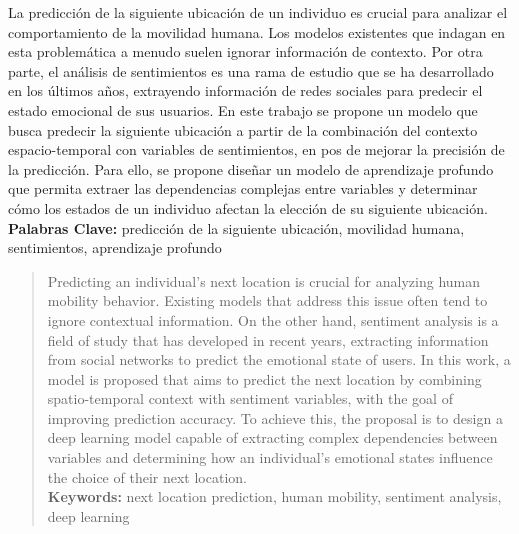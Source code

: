 \begin{resumen}
	La predicción de la siguiente ubicación de un individuo 
	es crucial para 
	analizar el comportamiento de la movilidad humana. 
	Los modelos existentes que indagan en esta problemática a 
	menudo suelen ignorar información de contexto. Por otra parte, 
	el análisis de sentimientos es una rama de estudio que se 
	ha desarrollado en los últimos años, extrayendo información 
	de redes sociales para predecir el estado emocional de sus usuarios.
	En este trabajo se propone un modelo que busca predecir la 
	siguiente ubicación a partir de la combinación del contexto 
	espacio-temporal con variables de sentimientos, en pos de mejorar 
	la precisión de la predicción. Para ello, se propone diseñar un 
	modelo de aprendizaje profundo que permita extraer las 
	dependencias complejas entre variables y determinar cómo los 
	estados de un individuo afectan la elección de su siguiente ubicación.\\

	\textbf{Palabras Clave:}
	predicci\'on de la siguiente ubicación, movilidad humana, sentimientos, aprendizaje profundo 
\end{resumen}
	
\begin{abstract}
	Predicting an individual's next location is crucial for analyzing 
	human mobility behavior. Existing models that address this issue often 
	tend to ignore contextual information. On the other hand, sentiment 
	analysis is a field of study that has developed in recent years, 
	extracting information from social networks to predict the emotional 
	state of users. In this work, a model is proposed that aims to 
	predict the next location by combining spatio-temporal context with 
	sentiment variables, with the goal of improving prediction accuracy.
	To achieve this, the proposal is to design a deep learning model 
	capable of extracting complex dependencies between variables and 
	determining how an individual's emotional states influence the 
	choice of their next location.\\

	\textbf{Keywords:}
	next location prediction, human mobility, sentiment analysis, deep learning
\end{abstract}
